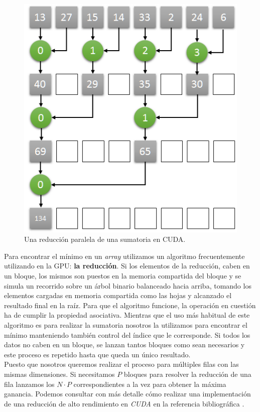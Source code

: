 \begin{figure}[ht]
\centering
\includegraphics[scale=0.5]{imagenes/parallel_reduce.png}
\caption{Una reducción paralela de una sumatoria en CUDA.}
\label{image:cudareduction}
\end{figure}

Para encontrar el mínimo en un \textit{array} utilizamos un algoritmo frecuentemente utilizando en la GPU: \textbf{la reducción}. Si los elementos de la reducción, caben en un bloque, los mismos son puestos en la memoria compartida del bloque y se simula un recorrido sobre un árbol binario balanceado hacia arriba, tomando los elementos cargadas en memoria compartida como las hojas y alcanzado el resultado final en la raíz. Para que el algoritmo funcione, la operación en cuestión ha de cumplir la propiedad asociativa. Mientras que el uso más habitual de este algoritmo es para realizar la sumatoria nosotros la utilizamos para encontrar el mínimo manteniendo también control del índice que le corresponde. Si todos los datos no caben en un bloque, se lanzan tantos bloques como sean necesarios y este proceso es repetido hasta que queda un único resultado. \\

Puesto que nosotros queremos realizar el proceso para múltiples filas con las mismas dimensiones. Si necesitamos $P$ bloques para resolver la reducción de una fila lanzamos los $N \cdot P$ correspondientes a la vez para obtener la máxima ganancia. Podemos consultar con más detalle cómo realizar una implementación de una reducción de alto rendimiento en \textit{CUDA} en la referencia bibliográfica \cite{reduction}.

